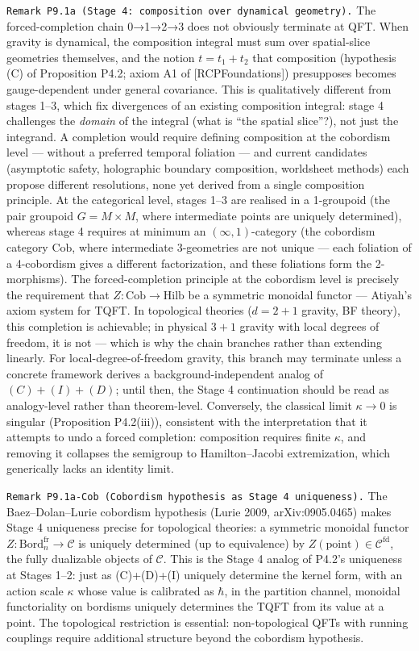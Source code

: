 \documentclass[
]{article}
\begin{document}
\texttt{Remark\ P9.1a\ (Stage\ 4:\ composition\ over\ dynamical\ geometry).}
The forced-completion chain 0→1→2→3 does not obviously terminate at QFT.
When gravity is dynamical, the composition integral must sum over
spatial-slice geometries themselves, and the notion \(t=t_1+t_2\) that
composition (hypothesis (C) of Proposition P4.2; axiom A1 of
{[}RCPFoundations{]}) presupposes becomes gauge-dependent under general
covariance. This is qualitatively different from stages 1--3, which fix
divergences of an existing composition integral: stage 4 challenges the
\emph{domain} of the integral (what is ``the spatial slice''?), not just
the integrand. A completion would require defining composition at the
cobordism level --- without a preferred temporal foliation --- and
current candidates (asymptotic safety, holographic boundary composition,
worldsheet methods) each propose different resolutions, none yet derived
from a single composition principle. At the categorical level, stages
1--3 are realised in a 1-groupoid (the pair groupoid \(G = M \times M\),
where intermediate points are uniquely determined), whereas stage 4
requires at minimum an \((\infty,1)\)-category (the cobordism category
\(\mathrm{Cob}\), where intermediate 3-geometries are not unique ---
each foliation of a 4-cobordism gives a different factorization, and
these foliations form the 2-morphisms). The forced-completion principle
at the cobordism level is precisely the requirement that
\(Z\colon \mathrm{Cob} \to \mathrm{Hilb}\) be a symmetric monoidal
functor --- Atiyah's axiom system for TQFT. In topological theories
(\(d=2{+}1\) gravity, BF theory), this completion is achievable; in
physical \(3{+}1\) gravity with local degrees of freedom, it is not ---
which is why the chain branches rather than extending linearly. For
local-degree-of-freedom gravity, this branch may terminate unless a
concrete framework derives a background-independent analog of
\((C)+(I)+(D)\); until then, the Stage 4 continuation should be read as
analogy-level rather than theorem-level. Conversely, the classical limit
\(\kappa\to 0\) is singular (Proposition P4.2(iii)), consistent with the
interpretation that it attempts to undo a forced completion: composition
requires finite \(\kappa\), and removing it collapses the semigroup to
Hamilton--Jacobi extremization, which generically lacks an identity
limit.

\texttt{Remark\ P9.1a-Cob\ (Cobordism\ hypothesis\ as\ Stage\ 4\ uniqueness).}
The Baez--Dolan--Lurie cobordism hypothesis (Lurie 2009,
arXiv:0905.0465) makes Stage 4 uniqueness precise for topological
theories: a symmetric monoidal functor
\(Z\colon \mathrm{Bord}_n^{\mathrm{fr}} \to \mathcal{C}\) is uniquely
determined (up to equivalence) by
\(Z(\mathrm{point}) \in \mathcal{C}^{\mathrm{fd}}\), the fully
dualizable objects of \(\mathcal{C}\). This is the Stage 4 analog of
P4.2's uniqueness at Stages 1--2: just as (C)+(D)+(I) uniquely determine
the kernel form, with an action scale \(\kappa\) whose value is
calibrated as \(\hbar\), in the partition channel, monoidal
functoriality on bordisms uniquely determines the TQFT from its value at
a point. The topological restriction is essential: non-topological QFTs
with running couplings require additional structure beyond the cobordism
hypothesis.
\end{document}
